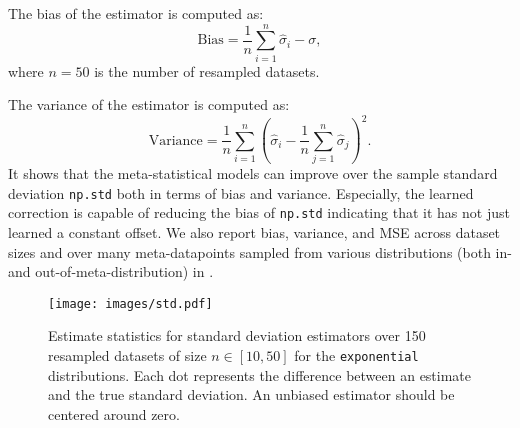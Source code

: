 The bias of the estimator is computed as:
\begin{equation}
\text{Bias} = \frac{1}{n} \sum_{i=1}^{n} \hat{\sigma}_i - \sigma,
\end{equation}
where \( n = 50 \) is the number of resampled datasets.

The variance of the estimator is computed as:
\begin{equation}
\text{Variance} = \frac{1}{n} \sum_{i=1}^{n} \left( \hat{\sigma}_i - \frac{1}{n} \sum_{j=1}^{n} \hat{\sigma}_j \right)^2.
\end{equation}
It shows that the meta-statistical models can improve over the sample standard deviation \texttt{np.std} both in terms of bias and variance. Especially, the learned correction is capable of reducing the bias of \texttt{np.std} indicating that it has not just learned a constant offset.
We also report bias, variance, and MSE across dataset sizes and over many meta-datapoints sampled from various distributions (both in- and out-of-meta-distribution) in .

\begin{figure}
    \centering
    \texttt{[image: images/std.pdf]}
    \caption{Estimate statistics for standard deviation estimators over 150 resampled datasets of size $n \in [10, 50]$ for the \texttt{exponential} distributions. Each dot represents the difference between an estimate and the true standard deviation. An unbiased estimator should be centered around zero.}
    \label{fig:std_bias_var}
\end{figure}



